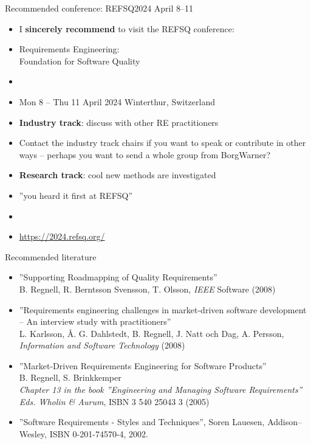 \documentclass{simpleslides}
\begin{document}
\begin{frame}[fragile]{Recommended conference: REFSQ2024 April 8--11}
\begin{itemize}
\item I \textbf{sincerely recommend} to visit the REFSQ conference:
\item[] Requirements Engineering:\\Foundation for Software Quality
\item[] 
\item Mon 8 -- Thu 11 April 2024 Winterthur, Switzerland 
\item \textbf{Industry track}: discuss with other RE practitioners
\item[] Contact the industry track chairs if you want to speak or contribute in other ways -- perhaps you want to send a whole group from BorgWarner?
\item \textbf{Research track}: cool new methods are investigated
\item [] ''you heard it first at REFSQ''
\item []
\item   \url{https://2024.refsq.org/}
\end{itemize}

\end{frame}

\begin{frame}[fragile]{Recommended literature}
\begin{itemize}\footnotesize%
\item ''Supporting Roadmapping of Quality Requirements'' \\ B. Regnell, R. Berntsson Svensson, T. Olsson, \emph{IEEE} Software (2008) 
\item ''Requirements engineering challenges in market-driven software development -- An interview study with practitioners'' \\ L. Karlsson, Å. G. Dahlstedt, B. Regnell, J. Natt och Dag, A. Persson, \emph{Information and Software Technology} (2008) 
\item ''Market-Driven Requirements Engineering for Software Products'' \\ B. Regnell, S. Brinkkemper \\ \emph{Chapter 13 in the book ''Engineering and Managing Software Requirements'' Eds. Wholin \& Aurum},  ISBN 3 540 25043 3 (2005)
\item ''Software Requirements - Styles and Techniques'', Soren Lauesen, Addison--Wesley, ISBN 0-201-74570-4, 2002.
\end{itemize}
\end{frame}
\end{document}
